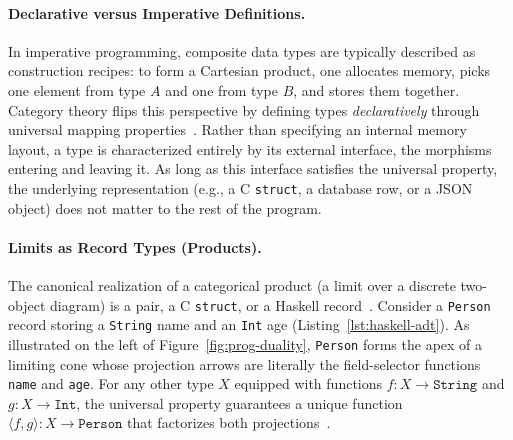 \paragraph{Declarative versus Imperative Definitions.}
In imperative programming, composite data types are typically described as construction recipes: to form a Cartesian product, one allocates memory, picks one element from type $A$ and one from type $B$, and stores them together. Category theory flips this perspective by defining types \emph{declaratively} through universal mapping properties~\cite[Ch.~11]{Milewski18}. Rather than specifying an internal memory layout, a type is characterized entirely by its external interface, the morphisms entering and leaving it. As long as this interface satisfies the universal property, the underlying representation (e.g., a C \texttt{struct}, a database row, or a JSON object) does not matter to the rest of the program.

\paragraph{Limits as Record Types (Products).}
The canonical realization of a categorical product (a limit over a discrete two-object diagram) is a pair, a C \texttt{struct}, or a Haskell record~\cite[Sec.~6.1--6.2]{Milewski18}. Consider a \texttt{Person} record storing a \texttt{String} name and an \texttt{Int} age (Listing~\ref{lst:haskell-adt}). As illustrated on the left of Figure~\ref{fig:prog-duality}, \texttt{Person} forms the apex of a limiting cone whose projection arrows are literally the field-selector functions \texttt{name} and \texttt{age}. For any other type $X$ equipped with functions $f \colon X \to \texttt{String}$ and $g \colon X \to \texttt{Int}$, the universal property guarantees a unique function $\langle f, g \rangle \colon X \to \texttt{Person}$ that factorizes both projections~\cite[Sec.~5.5]{Milewski18}.

